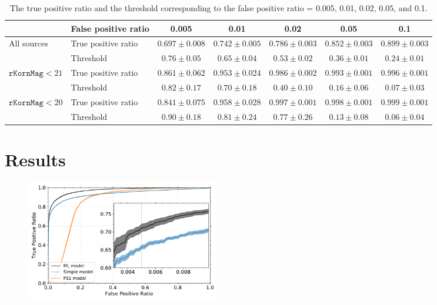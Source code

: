 \documentclass[twocolumn]{aastex62}
\begin{document}
\begin{table}
\begin{center}
\caption{The true positive ratio and the threshold 
corresponding to the false positive ratio = 0.005, 0.01, 0.02, 0.05, and 0.1. }
\label{tbl:fpr}
\begin{tabular}{llccccc}
\hline\hline
                                                 & False positive ratio & 0.005 & 0.01 & 0.02 & 0.05 & 0.1 \\ \hline
\multicolumn{1}{l}{\multirow{2}{*}{All sources}} & True positive ratio  & $0.697 \pm 0.008$ &  $0.742 \pm 0.005$ & $0.786 \pm 0.003$ & $0.852 \pm 0.003$ & $0.899 \pm 0.003$  \\
\multicolumn{1}{l}{}                             & Threshold & $0.76 \pm 0.05$ &  $0.65 \pm 0.04$ & $0.53 \pm 0.02$ & $0.36 \pm 0.01$ & $0.24 \pm 0.01$  \\ \hline
\multirow{2}{*}{$\mathtt{rKornMag} < 21$} & True positive ratio  & $0.861 \pm 0.062$ &  $0.953 \pm 0.024$ & $0.986 \pm 0.002$ & $0.993 \pm 0.001$ & $0.996 \pm 0.001$ \\
                                                 & Threshold & $0.82 \pm 0.17$ &  $0.70 \pm 0.18$ & $0.40 \pm 0.10$ & $0.16 \pm 0.06$ & $0.07 \pm 0.03$   \\ \hline
\multirow{2}{*}{$\mathtt{rKornMag} < 20$}  & True positive ratio  & $0.841 \pm 0.075$ &  $0.958 \pm 0.028$ & $0.997 \pm 0.001$ & $0.998 \pm 0.001$ & $0.999 \pm 0.001$  \\
                                                  & Threshold & $0.90 \pm 0.18$ &  $0.81 \pm 0.24$ & $0.77 \pm 0.26$ & $0.13 \pm 0.08$ & $0.06 \pm 0.04$ \\ \hline
\end{tabular}
\end{center}
\end{table}

\section{Results}

\begin{figure}[t]
 \centering
  \includegraphics[width=3.35in]{./Figures/CV_ROC_HST.pdf}
  \caption{}
  \label{fig:cvroc_hst}
\end{figure}
\end{document}
